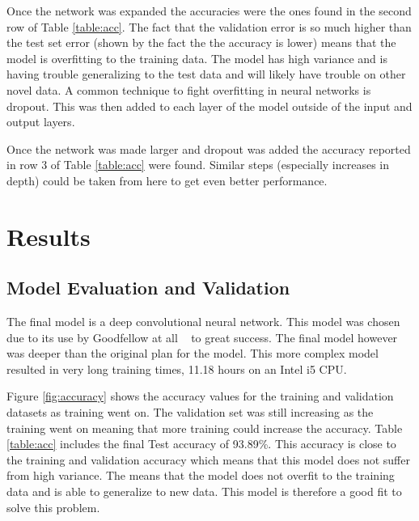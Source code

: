 \documentclass[12pt,twocolumn,letterpaper]{article}
\begin{document}
Once the network was expanded the accuracies were the ones found in the 
second row of Table \ref{table:acc}. The fact that the validation error is so much higher than 
the test set error (shown by the fact the the accuracy is lower) means that the
model is overfitting to the training data. The model has high variance and is having 
trouble generalizing to the test data and will likely have trouble on other novel 
data. A common technique to fight overfitting in neural networks is dropout. This 
was then added to each layer of the model outside of the input and output layers.

Once the network was made larger and dropout was added the accuracy reported in 
row 3 of Table \ref{table:acc} were found. Similar steps (especially increases in depth) could 
be taken from here to get even better performance.
\section{Results}
\subsection{Model Evaluation and Validation}

The final model is a deep convolutional neural network. This model was chosen due 
to its use by Goodfellow at all ~\cite{goodfellow} to great success. The final 
model however was deeper than the original plan for the model. This more complex
model resulted in very long training times, 11.18 hours on an Intel i5 CPU.

Figure \ref{fig:accuracy} shows the accuracy values for the training and validation 
datasets as training went on. The validation set was still increasing as the training
went on meaning that more training could increase the accuracy. Table \ref{table:acc}
includes the final Test accuracy of 93.89\%. This accuracy is close to the 
training and validation accuracy which means that this model does not suffer from 
high variance. The means that the model does not overfit to the training data and 
is able to generalize to new data. This model is therefore a good fit to solve 
this problem.
\end{document}
